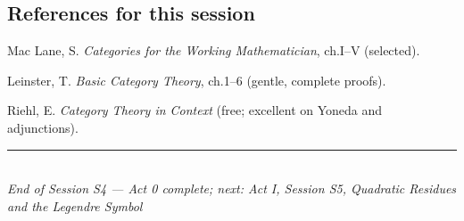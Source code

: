 \documentclass[11pt,a4paper]{article}
\theoremstyle{definition}
\begin{document}
\subsection*{References for this session}
\begin{enumerate}[label={[\arabic*]}]
  \item Mac Lane, S. \emph{Categories for the Working Mathematician}, ch.I--V (selected).
  \item Leinster, T. \emph{Basic Category Theory}, ch.1--6 (gentle, complete proofs).
  \item Riehl, E. \emph{Category Theory in Context} (free; excellent on Yoneda and adjunctions).
\end{enumerate}

\vspace{1.5em}
\begin{center}
\rule{0.6\textwidth}{0.4pt}\\[0.5em]
\textit{End of Session S4 --- Act 0 complete; next: Act I, Session S5, Quadratic Residues and the Legendre Symbol}
\end{center}
\end{document}
